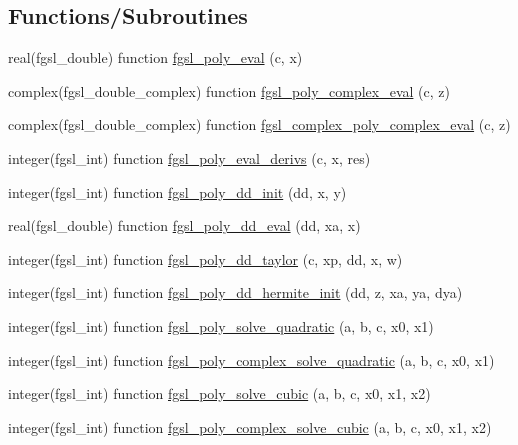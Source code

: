 \subsection*{Functions/\+Subroutines}
\begin{DoxyCompactItemize}
\item 
real(fgsl\+\_\+double) function \hyperlink{poly_8finc_ae781e76c4974085c40adad5ee7d18765}{fgsl\+\_\+poly\+\_\+eval} (c, x)
\item 
complex(fgsl\+\_\+double\+\_\+complex) function \hyperlink{poly_8finc_a90e9c2000063ce5d9fe5fb589be9cde2}{fgsl\+\_\+poly\+\_\+complex\+\_\+eval} (c, z)
\item 
complex(fgsl\+\_\+double\+\_\+complex) function \hyperlink{poly_8finc_a5cc507446025f6f9a32b4b073f69a2dd}{fgsl\+\_\+complex\+\_\+poly\+\_\+complex\+\_\+eval} (c, z)
\item 
integer(fgsl\+\_\+int) function \hyperlink{poly_8finc_aa61eaba18b05dba3d5c3375c038097ac}{fgsl\+\_\+poly\+\_\+eval\+\_\+derivs} (c, x, res)
\item 
integer(fgsl\+\_\+int) function \hyperlink{poly_8finc_a9414ee6e42cfade6f08005d78247e1bf}{fgsl\+\_\+poly\+\_\+dd\+\_\+init} (dd, x, y)
\item 
real(fgsl\+\_\+double) function \hyperlink{poly_8finc_aa4a8ca0867574aed59f3c0db1f0f8f59}{fgsl\+\_\+poly\+\_\+dd\+\_\+eval} (dd, xa, x)
\item 
integer(fgsl\+\_\+int) function \hyperlink{poly_8finc_a8fa885de79327177b906f6fd5d1e5663}{fgsl\+\_\+poly\+\_\+dd\+\_\+taylor} (c, xp, dd, x, w)
\item 
integer(fgsl\+\_\+int) function \hyperlink{poly_8finc_ad44cde0319ae8fcc422e498318bc8839}{fgsl\+\_\+poly\+\_\+dd\+\_\+hermite\+\_\+init} (dd, z, xa, ya, dya)
\item 
integer(fgsl\+\_\+int) function \hyperlink{poly_8finc_a21062b0907ae31ffc799938513ebae02}{fgsl\+\_\+poly\+\_\+solve\+\_\+quadratic} (a, b, c, x0, x1)
\item 
integer(fgsl\+\_\+int) function \hyperlink{poly_8finc_afe315cb11581a666f03d0c9f2dc78233}{fgsl\+\_\+poly\+\_\+complex\+\_\+solve\+\_\+quadratic} (a, b, c, x0, x1)
\item 
integer(fgsl\+\_\+int) function \hyperlink{poly_8finc_ae68c5a984c47341773668044f141ce19}{fgsl\+\_\+poly\+\_\+solve\+\_\+cubic} (a, b, c, x0, x1, x2)
\item 
integer(fgsl\+\_\+int) function \hyperlink{poly_8finc_a4f38dcb84e7589b62c5419ec6f5816ca}{fgsl\+\_\+poly\+\_\+complex\+\_\+solve\+\_\+cubic} (a, b, c, x0, x1, x2)
\item 

\end{DoxyCompactItemize}
